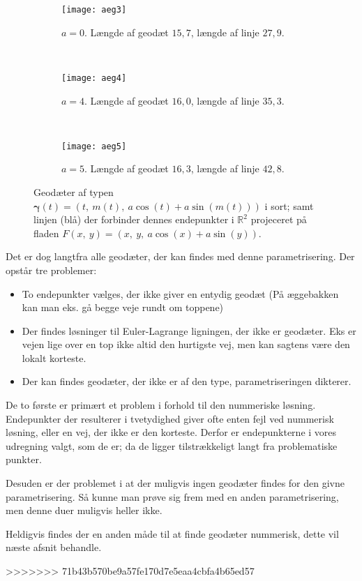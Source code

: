  \begin{figure}
        \centering
        \begin{subfigure}[b]{0.3\textwidth}
                \centering
                \texttt{[image: aeg3]}
                \caption{\(a=0\). Længde af geodæt \(15,7\), længde af linje \(27,9\).}
                \label{fig:aeg3}
        \end{subfigure}%
        ~ %
        \begin{subfigure}[b]{0.3\textwidth}
                \centering
                \texttt{[image: aeg4]}
                \caption{\(a=4\). Længde af geodæt \(16,0\), længde af linje \(35,3\).}
                \label{fig:aeg4}
        \end{subfigure}
        ~ %
        \begin{subfigure}[b]{0.3\textwidth}
                \centering
                \texttt{[image: aeg5]}
                \caption{\(a=5\). Længde af geodæt \(16,3\), længde af linje \(42,8\).}
                \label{fig:aeg5}
        \end{subfigure}
        \caption{
        Geodæter af typen \(\pmb{\gamma}(t) = (t,~m(t),~a\cos(t) + a\sin(m(t)))\) i sort;
        samt linjen (blå) der forbinder dennes endepunkter i \(\mathbb{R}^2\) projeceret på fladen \(F(x,~y)=(x,~y,~a\cos(x)+a\sin(y))\).}%
\end{figure}

Det er dog langtfra alle geodæter, der kan findes med denne parametrisering. Der opstår tre problemer:
\begin{itemize}
\item To endepunkter vælges, der ikke giver en entydig geodæt (På æggebakken kan man eks. gå begge veje rundt om toppene)
\item Der findes løsninger til Euler-Lagrange ligningen, der ikke er geodæter. Eks er vejen lige over en top ikke altid den hurtigste vej,
men kan sagtens være den lokalt korteste.
\item Der kan findes geodæter, der ikke er af den type, parametriseringen dikterer.
\end{itemize}

De to første er primært et problem i forhold til den nummeriske løsning.
Endepunkter der resulterer i tvetydighed giver ofte enten fejl ved nummerisk løsning, eller en vej, der ikke er den korteste.
Derfor er endepunkterne i vores udregning valgt, som de er; da de ligger tilstrækkeligt langt fra problematiske punkter.

Desuden er der problemet i at der muligvis ingen geodæter findes for den givne parametrisering.
Så kunne man prøve sig frem med en anden parametrisering, men denne duer muligvis heller ikke.

Heldigvis findes der en anden måde til at finde geodæter nummerisk, dette vil næste afsnit behandle.

>>>>>>> 71b43b570be9a57fe170d7e5eaa4cbfa4b65ed57
